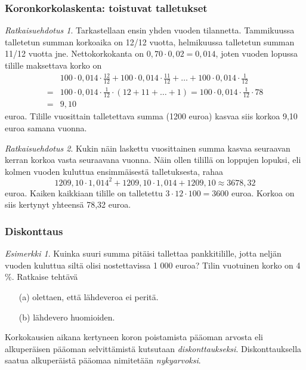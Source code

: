 \documentclass[handout]{beamer}\usepackage[]{graphicx}\usepackage[]{color}
\theoremstyle{remark}
\newtheorem{esim}{Esimerkki}
\newtheorem{ratkaisu}{Ratkaisuehdotus}
\begin{document}
\begin{frame}
    \frametitle{Koronkorkolaskenta: toistuvat talletukset}
    \pause
    \begin{ratkaisu}
      \pause
        Tarkastellaan ensin yhden vuoden tilannetta. 
        \pause
        Tammikuussa talletetun summan korkoaika on 12/12 vuotta, helmikuussa
        talletetun summan 11/12 vuotta jne. 
        \pause Nettokorkokanta on \(0,70\cdot 0,02 = 0,014\),
        joten vuoden lopussa tilille maksettava korko on 
        \pause
        \begin{align*}
             &100\cdot0,014\cdot\frac{12}{12} + 100\cdot0,014\cdot\frac{11}{12} + \ldots + 100\cdot0,014\cdot\frac{1}{12}\\
            =&100\cdot0,014\cdot\frac{1}{12}\cdot(12+11+\ldots+1) = 100\cdot0,014\cdot\frac{1}{12}\cdot78\\
            =&9,10
        \end{align*}
        euroa. 
        \pause Tilille vuosittain talletettava summa (1200 euroa) kasvaa siis korkoa 9,10 euroa samana vuonna.
    \end{ratkaisu}
\end{frame}

\begin{frame}
    \begin{ratkaisu}
        Kukin näin laskettu vuosittainen summa kasvaa seuraavan kerran korkoa vasta seuraavana vuonna.
        \pause
        Näin ollen tilillä on loppujen lopuksi, eli kolmen vuoden kuluttua ensimmäisestä talletuksesta, rahaa \pause
        \[
            1209,10\cdot 1,014^2+1209,10\cdot1,014+1209,10\approx 3678,32
        \]
        euroa.
        \pause
        Kaiken kaikkiaan tilille on talletettu \(3\cdot12\cdot100 = 3600\) euroa.
        \pause
        Korkoa on siis kertynyt yhteensä 78,32 euroa.
    \end{ratkaisu}
\end{frame}

\begin{frame}
    \frametitle{Diskonttaus}
    \pause
    \begin{esim}
        Kuinka suuri summa pitäisi tallettaa pankkitilille, jotta neljän vuoden kuluttua siltä olisi nostettavissa 1 000 euroa? 
        Tilin vuotuinen korko on 4 \%. Ratkaise tehtävä
        \begin{enumerate}
            \item[(a)] olettaen, että lähdeveroa ei peritä.
            \item[(b)] lähdevero huomioiden.
        \end{enumerate}
    \end{esim}
    \pause
    Korkokausien aikana kertyneen koron poistamista pääoman arvosta eli alkuperäisen pääoman selvittämistä kutsutaan 
    \emph{diskonttaukseksi}.
    \pause
    Diskonttauksella saatua alkuperäistä pääomaa nimitetään \emph{nykyarvoksi}.
\end{frame}
\end{document}
